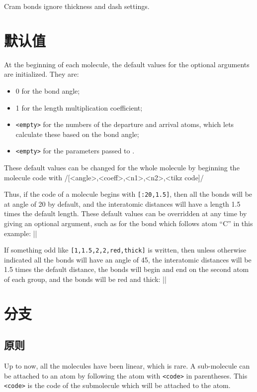 \documentclass[10pt]{article}
\begin{document}
Cram bonds ignore thickness and dash settings.

\section{默认值}
At the beginning of each molecule, the default values for the optional arguments are initialized. They are:
\begin{itemize}
	\item 0\degres{} for the bond angle;
	\item 1 for the length multiplication coefficient;
	\item \verb-<empty>- for the numbers of the departure and arrival atoms, which lets \CF calculate these based on the bond angle;
	\item \verb-<empty>- for the parameters passed to \TIKZ.
\end{itemize}

These default values can be changed for the whole molecule by beginning the molecule code with
\centerverb/[<angle>,<coeff>,<n1>,<n2>,<tikz code]/
\smallskip

Thus, if the code of a molecule begins with \verb-[:20,1.5]-, then all the bonds will be at angle of 20\degres{} by default, and the interatomic distances will have a length 1.5 times the default length. These default values can be overridden at any time by giving an optional argument, such as for the bond which follows atom ``C'' in this example:
||

If something odd like \verb-[1,1.5,2,2,red,thick]- is written, then unless otherwise indicated all the bonds will have an angle of 45\degres{}, the interatomic distances will be 1.5 times the default distance, the bonds will begin and end on the second atom of each group, and the bonds will be red and thick:
||

\section{分支}
\subsection{原则}
Up to now, all the molecules have been linear, which is rare. A sub-molecule can be attached to an atom by following the atom with \verb-<code>- in parentheses. This \verb-<code>- is the code of the submolecule which will be attached to the atom.
\end{document}
